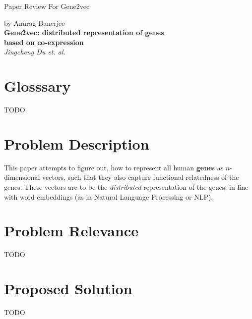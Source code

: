 \documentclass{article}
\begin{document}
    \begin{center}
    
        \Large{Paper Review For Gene2vec} \\
        \author{}{by Anurag Banerjee}\\
        
        \vspace{1em}
        \LARGE{\textbf{Gene2vec: distributed representation of genes \\ based on co-expression}\cite{gene2vec}} \\
    	\Large{\textit{Jingcheng Du et. al.}} \\
     
    \end{center}
    \begin{normalsize}
    
    	\section{Glosssary}
		TODO
		
		\section{Problem Description}
        This paper attempts to figure out, how to represent all human \textbf{gene}s as $n$-dimensional
		vectors, such that they also capture functional relatedness of the genes.
		These vectors are to be the \textit{distributed} representation of the genes,
		in line with word embeddings (as in Natural Language Processing or NLP).
                
        \section{Problem Relevance}
        TODO
        
	   	\section{Proposed Solution}
		TODO
	   	

\end{normalsize}
\end{document}
